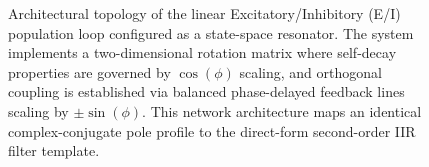 \begin{figure}[htbp]
    \caption{Architectural topology of the linear Excitatory/Inhibitory (E/I) population loop configured as a state-space resonator. The system implements a two-dimensional rotation matrix where self-decay properties are governed by $\cos(\phi)$ scaling, and orthogonal coupling is established via balanced phase-delayed feedback lines scaling by $\pm\sin(\phi)$. This network architecture maps an identical complex-conjugate pole profile to the direct-form second-order IIR filter template.}
    \label{fig:ei_population_resonator}
\end{figure}
